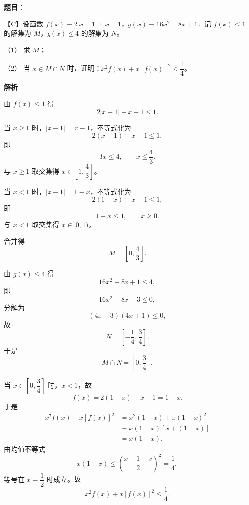 \begin{answer}

\textbf{题目}：

【C】设函数 $f(x)=2|x-1|+x-1$，$g(x)=16x^2-8x+1$，记 $f(x)\leqslant 1$ 的解集为 $M$，$g(x)\leqslant 4$ 的解集为 $N$。

（1） 求 $M$；

（2） 当 $x\in M\cap N$ 时，证明：$x^2f(x)+x[f(x)]^2\leqslant\dfrac14$。

\textbf{解析}


由 $f(x)\leqslant1$ 得
\nopagebreak[4]
\[2|x-1|+x-1\leqslant1.\]

当 $x\geqslant1$ 时，$|x-1|=x-1$，不等式化为
\nopagebreak[4]
\[2(x-1)+x-1\leqslant1,\]
即
\nopagebreak[4]
\[3x\leqslant4,\qquad x\leqslant\frac43.\]
与 $x\geqslant1$ 取交集得 $x\in\left[1,\dfrac43\right]$。

当 $x<1$ 时，$|x-1|=1-x$，不等式化为
\nopagebreak[4]
\[2(1-x)+x-1\leqslant1,\]
即
\nopagebreak[4]
\[1-x\leqslant1,\qquad x\geqslant0.\]
与 $x<1$ 取交集得 $x\in[0,1)$。

合并得
\nopagebreak[4]
\[M=\left[0,\frac43\right].\]


由 $g(x)\leqslant4$ 得
\nopagebreak[4]
\[16x^2-8x+1\leqslant4,\]
即
\nopagebreak[4]
\[16x^2-8x-3\leqslant0,\]
分解为
\nopagebreak[4]
\[(4x-3)(4x+1)\leqslant0,\]
故
\nopagebreak[4]
\[N=\left[-\frac14,\frac34\right].\]
于是
\nopagebreak[4]
\[M\cap N=\left[0,\frac34\right].\]

当 $x\in\left[0,\dfrac34\right]$ 时，$x<1$，故
\nopagebreak[4]
\[f(x)=2(1-x)+x-1=1-x.\]
于是
\nopagebreak[4]
\[\begin{aligned}
x^2f(x)+x[f(x)]^2&=x^2(1-x)+x(1-x)^2\\
&=x(1-x)\left[x+(1-x)\right]\\
&=x(1-x).
\end{aligned}\]
由均值不等式
\nopagebreak[4]
\[x(1-x)\leqslant\left(\frac{x+1-x}2\right)^2=\frac14,\]
等号在 $x=\dfrac12$ 时成立。故
\nopagebreak[4]
\[x^2f(x)+x[f(x)]^2\leqslant\frac14.\]



\end{answer}